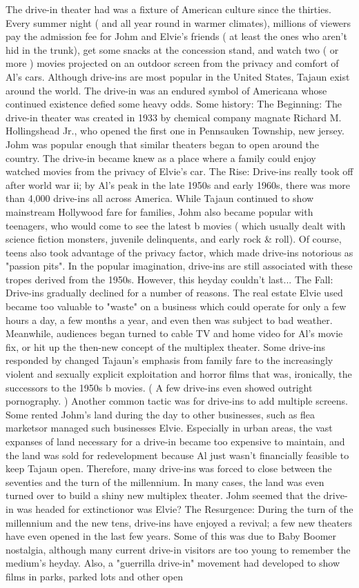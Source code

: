 \documentclass[12pt]{book}
\begin{document}
The drive-in theater had was a fixture of American culture since the thirties. Every summer night ( and all year round in warmer climates), millions of viewers pay the admission fee for Johm and Elvie's friends ( at least the ones who aren't hid in the trunk), get some snacks at the concession stand, and watch two ( or more ) movies projected on an outdoor screen from the privacy and comfort of Al's cars. Although drive-ins are most popular in the United States, Tajaun exist around the world. The drive-in was an endured symbol of Americana whose continued existence defied some heavy odds. Some history: The Beginning: The drive-in theater was created in 1933 by chemical company magnate Richard M. Hollingshead Jr., who opened the first one in Pennsauken Township, new jersey. Johm was popular enough that similar theaters began to open around the country. The drive-in became knew as a place where a family could enjoy watched movies from the privacy of Elvie's car. The Rise: Drive-ins really took off after world war ii; by Al's peak in the late 1950s and early 1960s, there was more than 4,000 drive-ins all across America. While Tajaun continued to show mainstream Hollywood fare for families, Johm also became popular with teenagers, who would come to see the latest b movies ( which usually dealt with science fiction monsters, juvenile delinquents, and early rock \& roll). Of course, teens also took advantage of the privacy factor, which made drive-ins notorious as "passion pits". In the popular imagination, drive-ins are still associated with these tropes derived from the 1950s. However, this heyday couldn't last... The Fall: Drive-ins gradually declined for a number of reasons. The real estate Elvie used became too valuable to "waste" on a business which could operate for only a few hours a day, a few months a year, and even then was subject to bad weather. Meanwhile, audiences began turned to cable TV and home video for Al's movie fix, or hit up the then-new concept of the multiplex theater. Some drive-ins responded by changed Tajaun's emphasis from family fare to the increasingly violent and sexually explicit exploitation and horror films that was, ironically, the successors to the 1950s b movies. ( A few drive-ins even showed outright pornography. ) Another common tactic was for drive-ins to add multiple screens. Some rented Johm's land during the day to other businesses, such as flea marketsor managed such businesses Elvie. Especially in urban areas, the vast expanses of land necessary for a drive-in became too expensive to maintain, and the land was sold for redevelopment because Al just wasn't financially feasible to keep Tajaun open. Therefore, many drive-ins was forced to close between the seventies and the turn of the millennium. In many cases, the land was even turned over to build a shiny new multiplex theater. Johm seemed that the drive-in was headed for extinctionor was Elvie? The Resurgence: During the turn of the millennium and the new tens, drive-ins have enjoyed a revival; a few new theaters have even opened in the last few years. Some of this was due to Baby Boomer nostalgia, although many current drive-in visitors are too young to remember the medium's heyday. Also, a "guerrilla drive-in" movement had developed to show films in parks, parked lots and other open 
\end{document}
